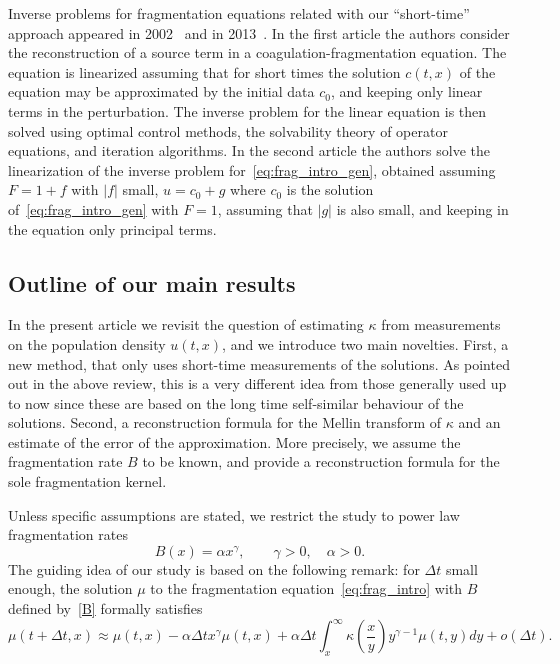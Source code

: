 \documentclass[AHL,Unicode,longabstracts,published]{cedram}
\newcommand*\dst{\displaystyle}
\renewcommand*\a{\alpha}
\begin{document}
Inverse problems for fragmentation equations related with our ``short-time'' approach appeared in 2002~\cite{AgoshkovDubovski} and in 2013~\cite{Alomari}. In the first article the authors consider the reconstruction of a source term in a coagulation-fragmentation equation. The equation is linearized assuming that for short times the solution $c(t, x)$ of the equation may be approximated by the initial data $c_0$, and keeping only linear terms in the perturbation. The inverse problem for the linear equation is then solved using optimal control methods, the solvability theory of operator equations, and iteration algorithms. In the second article the authors solve the linearization of the inverse problem for~\eqref{eq:frag_intro_gen}, obtained assuming $F=1+f$ with $|f|$ small, $u=c_0+g$ where $c_0$ is the solution of~\eqref{eq:frag_intro_gen} with $F=1$, assuming that $|g|$ is also small, and keeping in the equation only principal terms.




\subsection{Outline of our main results}

In the present article we revisit the question of estimating $\kappa$ from measurements on the population density $u(t,x)$, and we introduce two main novelties. First, a new method, that only uses short-time measurements of the solutions. As pointed out in the above review, this is a very different idea from those generally used up to now since these are based on the long time self-similar behaviour of the solutions. Second, a reconstruction formula for the Mellin transform of $\kappa$ and an estimate of the error of the approximation. More precisely, we assume the fragmentation rate $B$ to be known, and provide a reconstruction formula for the sole fragmentation kernel.

Unless specific assumptions are stated, we restrict the study to power law fragmentation rates
\begin{equation}\label{B}
B(x)= \a x^{\gamma}, \qquad \gamma>0,\quad \alpha > 0.
\end{equation}
 The guiding idea of our study is based on the following remark: for $\Delta t$ small enough, the solution $\mu$ to the fragmentation equation~\eqref{eq:frag_intro} with $B$ defined by~\eqref{B} formally satisfies
\begin{equation}\label{eq:approx1}
\mu (t+\Delta t,x)\approx \mu (t,x) -\a \Delta t x^{\gamma}\mu (t,x)+ \alpha \Delta t \dst\int_{x}^{\infty}\kappa\left(\dfrac{x}{y} \right)y^{\gamma-1} \mu (t,y)dy+ o(\Delta t).
\end{equation}
\end{document}
